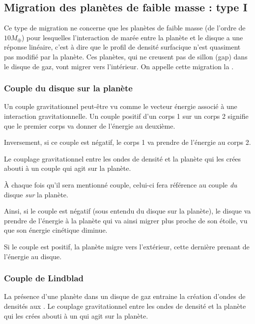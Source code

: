 \subsection{Migration des planètes de faible masse : type I}
Ce type de migration ne concerne que les planètes de faible masse (de l'ordre de $10M_{\oplus}$) pour lesquelles l'interaction de marée entre la planète et le disque a une réponse linéaire, c'est à dire que le profil de densité surfacique n'est quasiment pas modifié par la planète. Ces planètes, qui ne creusent pas de sillon (gap) dans le disque de gaz, vont migrer vers l'intérieur. On appelle cette migration la .


\subsubsection{Couple du disque sur la planète}
Un couple gravitationnel peut-être vu comme le vecteur énergie associé à une interaction gravitationnelle. Un couple positif d'un corps 1 sur un corps 2 signifie que le premier corps va donner de l'énergie au deuxième.

Inversement, si ce couple est négatif, le corps 1 va prendre de l'énergie au corps 2.

\bigskip

Le couplage gravitationnel entre les ondes de densité et la planète qui les crées abouti à un couple qui agit sur la planète.

\begin{attention}
À chaque fois qu'il sera mentionné \og couple\fg, celui-ci fera référence au couple \emph{du} disque \emph{sur} la planète.

Ainsi, si le couple est négatif (sous entendu du disque sur la planète), le disque va prendre de l'énergie à la planète qui va ainsi migrer plus proche de son étoile, vu que son énergie cinétique diminue.

Si le couple est positif, la planète migre vers l'extérieur, cette dernière prenant de l'énergie au disque.
\end{attention}

\subsubsection{Couple de Lindblad}
La présence d'une planète dans un disque de gaz entraine la création d'ondes de densités aux  \citep{goldreich1979excitation}. Le couplage gravitationnel entre les ondes de densité et la planète qui les crées abouti à un  qui agit sur la planète.

